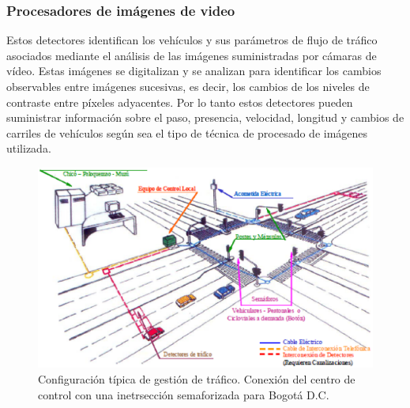 \subsubsection{Procesadores de imágenes de video}
Estos detectores identifican los vehículos y sus parámetros de flujo de tráfico asociados mediante el análisis de las imágenes 
suministradas por cámaras de vídeo. Estas imágenes se digitalizan y se analizan para identificar los cambios observables entre 
imágenes sucesivas, es decir, los cambios de los niveles de contraste entre píxeles adyacentes. Por lo tanto estos detectores 
pueden suministrar información sobre el paso, presencia, velocidad, longitud y cambios de carriles de vehículos según sea el 
tipo de técnica de procesado de imágenes utilizada\cite{14}.
\begin{figure}[h]
    \centering
    \includegraphics[width=1\textwidth]{ima/ca_phpB1BaNG}
    \caption{Configuración  típica de gestión de tráfico. Conexión del centro de control con una inetrsección semaforizada para Bogotá D.C. \cite{5}}
    \label{fig:mesh5}
\end{figure}